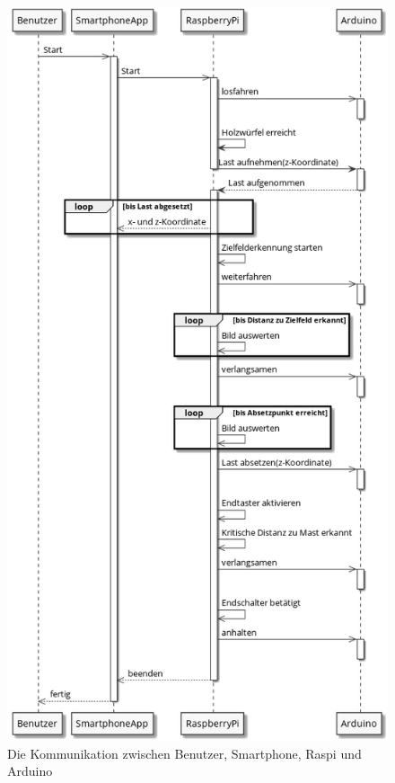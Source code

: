 \begin{figure}
    \centering
    \includegraphics[height=\textheight]{graphs/sequenzdiagramm.png}
    \caption{Die Kommunikation zwischen Benutzer, Smartphone, Raspi und Arduino}
    \label{fig:kommunikation}
\end{figure}
